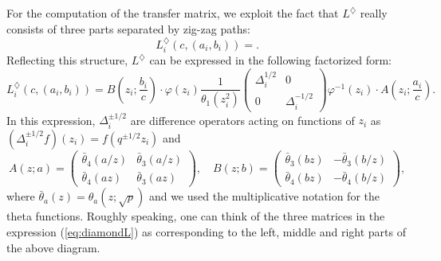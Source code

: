 For the computation of the transfer matrix, we exploit the fact that
$L^{\diamondsuit}$ really consists of three parts separated by zig-zag
paths:
\begin{equation}
    L_{i}^{\diamondsuit}\left(c,\left(a_{i},b_{i}\right)\right)  =  .  \label{eq:pieceL}
\end{equation}
 Reflecting this structure, $L^{\diamondsuit}$ can be expressed in
the following factorized form:
\begin{equation}
    L_{i}^{\diamondsuit}\left(c,\left(a_{i},b_{i}\right)\right)  
      =  
        B\left(z_{i};\frac{b_{i}}{c}\right)\cdot\varphi(z_{i})
          \frac{1}{\theta_{1}(z_{i}^{2})}
          \left(
          \begin{array}{cc}
              \Delta_{i}^{1/2}  &  0\\
              0                            &  \Delta_{i}^{-1/2}
              \end{array}
          \right)
          \varphi^{-1}(z_{i})\cdot A\left(z_{i};\frac{a_{i}}{c}\right).  \label{eq:diamondL}
\end{equation}
 In this expression, $\Delta_{i}^{\pm1/2}$ are difference operators
acting on functions of $z_{i}$ as $\left(\Delta_{i}^{\pm1/2}f\right)(z_{i})=f(q^{\pm1/2}z_{i})$
and 
\begin{equation}
    A(z;a)  
    =\left(
        \begin{array}{cc}
          \bar{\theta}_{4}(a/z) & \bar{\theta}_{3}(a/z)\\
          \bar{\theta}_{4}(az)  & \bar{\theta}_{3}(az)
        \end{array}
      \right),
        \quad
    B(z;b)  
    =\left(
        \begin{array}{cc}
          \bar{\theta}_{3}(bz) & -\bar{\theta}_{3}(b/z)\\
          \bar{\theta}_{4}(bz) & -\bar{\theta}_{4}(b/z)
        \end{array}
      \right),
\end{equation}
 where $\bar{\theta}_{a}(z)=\theta_{a}(z;\sqrt{p})$ and we used the
multiplicative notation for the theta functions. Roughly speaking,
one can think of the three matrices in the expression (\ref{eq:diamondL})
as corresponding to the left, middle and right parts of the above
diagram. 

